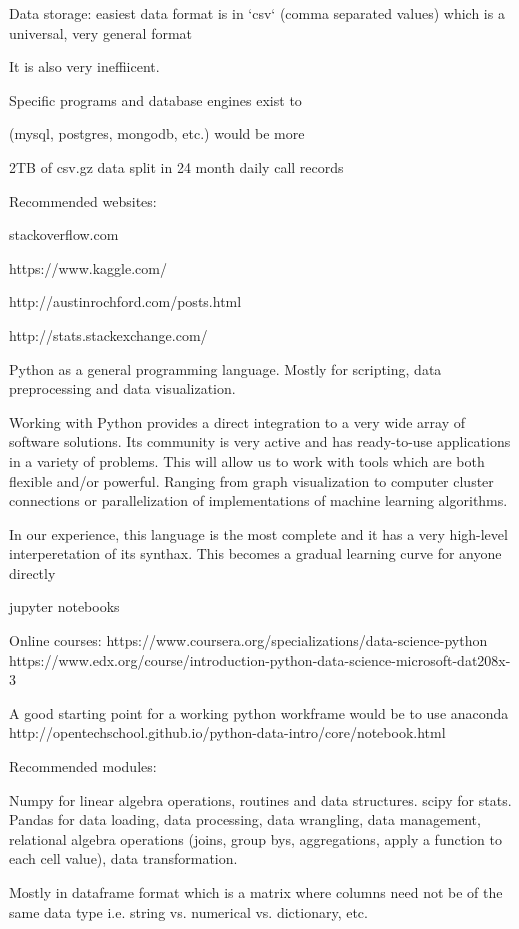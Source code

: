 \documentclass{article}%
\theoremstyle{definition}
\begin{document}
Data storage: easiest data format is in `csv` (comma separated values) which is a universal, very general format 

It is also very ineffiicent. 

Specific programs and database engines exist to 

(mysql, postgres, mongodb, etc.) would be more 

2TB of csv.gz data split in 24 month daily call records

Recommended websites:

stackoverflow.com

https://www.kaggle.com/

http://austinrochford.com/posts.html

http://stats.stackexchange.com/

Python as a general programming language. Mostly for scripting, data preprocessing and data visualization. 

Working with Python provides a direct integration to a very wide array of software solutions. Its community is very active and has ready-to-use applications in a variety of problems. This will allow us to work with tools which are both flexible and/or powerful. Ranging from graph visualization to computer cluster connections or parallelization of implementations of machine learning algorithms.

In our experience, this language is the most complete and it has a very high-level interperetation of its synthax. This becomes a gradual learning curve for anyone directly

jupyter notebooks

Online courses:
https://www.coursera.org/specializations/data-science-python
https://www.edx.org/course/introduction-python-data-science-microsoft-dat208x-3

A good starting point for a working python workframe would be to use anaconda 
http://opentechschool.github.io/python-data-intro/core/notebook.html


Recommended modules:

Numpy for linear algebra operations, routines and data structures.
scipy for stats.
Pandas for data loading, data processing, data wrangling, data management, relational algebra  operations (joins, group bys, aggregations, apply a function to each cell value), data transformation. 

Mostly in dataframe format which is a matrix where columns need not be of the same data type i.e. string vs. numerical vs. dictionary, etc.
\end{document}
